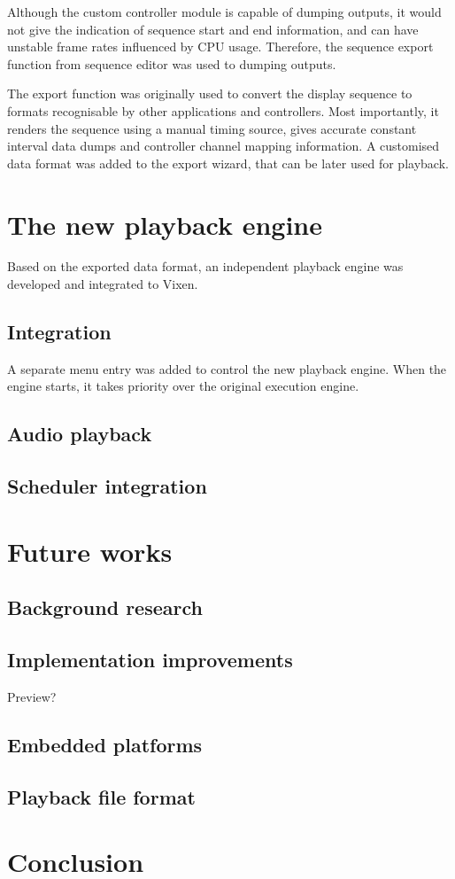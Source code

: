\documentclass[journal]{IEEEtran}
\begin{document}
Although the custom controller module is capable of dumping outputs, it would not give the indication of sequence start and end information, and can have unstable frame rates influenced by CPU usage. Therefore, the sequence export function from sequence editor was used to dumping outputs.

The export function was originally used to convert the display sequence to formats recognisable by other applications and controllers. Most importantly, it renders the sequence using a manual timing source, gives accurate constant interval data dumps and controller channel mapping information. A customised data format was added to the export wizard, that can be later used for playback.

\section{The new playback engine}

Based on the exported data format, an independent playback engine was developed and integrated to Vixen.

\subsection{Integration}

A separate menu entry was added to control the new playback engine. When the engine starts, it takes priority over the original execution engine.

\subsection{Audio playback}

\subsection{Scheduler integration}

\section{Future works}

\subsection{Background research}

\subsection{Implementation improvements}

Preview?

\subsection{Embedded platforms}

\subsection{Playback file format}

\section{Conclusion}




\end{document}
